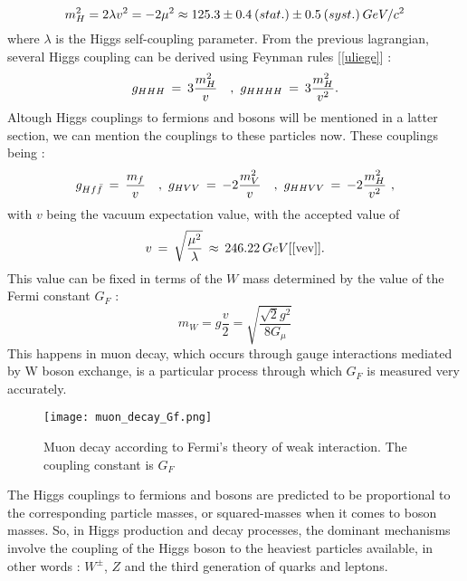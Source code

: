 \documentclass [12pt] {article}
\numberwithin{equation}{section} %
\numberwithin{figure}{section}   %
\newcommand{\Hquad}{\hspace{0.35em}}
\newcommand{\HHquad}{\hspace{0.2em}}
\begin{document}
\begin{equation}
    m^2_H = 2 \lambda v^2 = -2 \mu^2 \approx 125.3 \pm 0.4 \HHquad (stat.) \pm 0.5 \HHquad (syst.) \HHquad GeV/c^2
\end{equation}
where $\lambda$ is the Higgs self-coupling parameter.
From the previous lagrangian, several Higgs coupling can be derived using Feynman rules [\ref{uliege}] :
\begin{equation}
    g_{HHH} \HHquad = \HHquad 3 \frac{m^2_H}{v} \quad , \Hquad g_{HHHH} \HHquad = \HHquad 3 \frac{m^2_H}{v^2}.
\end{equation}
Altough Higgs couplings to fermions and bosons will be mentioned in a latter section, we can mention the couplings to these particles now. These couplings being :
\begin{equation}
    g_{Hf\Bar{f}} \HHquad = \HHquad  \frac{m_f}{v} \quad, \Hquad g_{HVV} \HHquad = \HHquad  -2 \frac{m^2_V}{v}  \quad, \Hquad g_{HHVV} \HHquad = \HHquad -2 \frac{m^2_H}{v^2} \Hquad ,
\end{equation}
with $v$ being the vacuum expectation value, with the accepted value of
\begin{equation}
    v \HHquad = \HHquad \sqrt{\frac{\mu^2}{\lambda}} \HHquad \approx \HHquad 246.22 \HHquad GeV [\ref{vev}].
    \label{vev}
\end{equation}
This value can be fixed in terms of the $W$ mass determined by the value of the Fermi constant $G_F$ :
\begin{equation}
    m_W = g\frac{v}{2} = \sqrt{\frac{\sqrt{2} g^2}{8 G_\mu}} %
\end{equation}
This happens in muon decay, which occurs through gauge interactions mediated by W boson exchange, is a particular process through which $G_F$ is measured very accurately.

\begin{figure}[H]
    \centering
    \texttt{[image: muon\_decay\_Gf.png]}
    \caption{Muon decay according to Fermi's theory of weak interaction. The coupling constant is $G_F$}
    \label{fig:enter-label}
\end{figure}

The Higgs couplings to fermions and bosons are predicted to be proportional to the corresponding particle masses, or squared-masses when it comes to boson masses. So, in Higgs production and decay processes, the dominant mechanisms involve the coupling of the Higgs boson to the heaviest particles available, in other words : $W^\pm$, $Z$ and the third generation of quarks and leptons.
\end{document}

